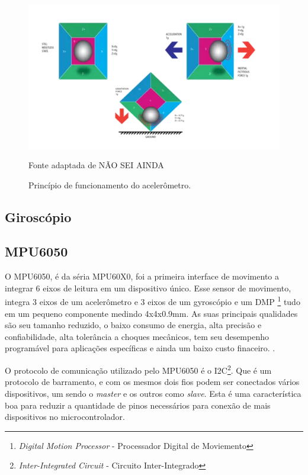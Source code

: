 \begin{figure}[h]
	\centering
	\includegraphics[keepaspectratio=true,scale=0.5
	]{figuras/acelerometro.png}
	\caption{Princípio de funcionamento do acelerômetro.}
	Fonte adaptada de NÃO SEI AINDA
	\label{acel}
	
\end{figure}

\subsection{Giroscópio}

\subsection{MPU6050}
	
	O MPU6050, é da séria MPU60X0, foi a primeira interface de movimento a integrar 6 eixos de leitura em um dispositivo único. Esse sensor de movimento, integra 3 eixos de um acelerômetro e 3 eixos de um gyroscópio e um DMP \footnote{\textit{Digital Motion Processor} - Processador Digital de Moviemento} tudo em um pequeno componente medindo 4x4x0.9mm. As suas principais qualidades são seu tamanho reduzido, o baixo consumo de energia, alta precisão e confiabilidade, alta tolerância a choques mecânicos, tem seu desempenho programável para aplicações específicas e ainda um baixo custo finaceiro. \cite{mpu6050}.
	
	O protocolo de comunicação utilizado pelo MPU6050 é o I2C\footnote{\textit{Inter-Integrated Circuit} - Circuito Inter-Integrado}. Que é um protocolo de barramento, e com os mesmos dois fios podem ser conectados vários dispositivos, um sendo o \textit{master} e os outros como \textit{slave}. Esta é uma característica boa para reduzir a quantidade de pinos necessários para conexão de mais dispositivos no microcontrolador.\cite{mpu6050}
	
